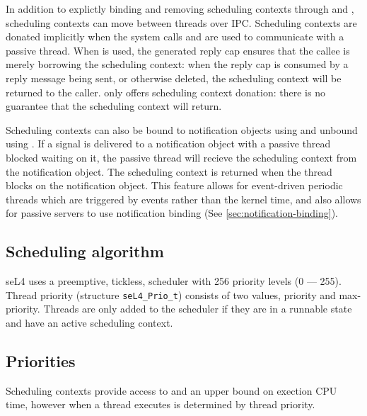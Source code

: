 In addition to explictly binding and removing scheduling contexts through  and , scheduling contexts can move between threads over IPC.
Scheduling contexts are donated implicitly when the system calls  and  are used to communicate with a passive thread.
When  is used, the generated reply cap ensures that the callee is merely borrowing the scheduling context: when the reply cap is consumed by a reply message being sent, or otherwise deleted, the scheduling context will be returned to the caller.
 only offers scheduling context donation: there is no guarantee that the scheduling context will return.

Scheduling contexts can also be bound to notification objects using  and unbound using .
If a signal is delivered to a notification object with a passive thread blocked waiting on it, the passive thread will recieve the scheduling context from the notification object.
The scheduling context is returned when the thread blocks on the notification object. 
This feature allows for event-driven periodic threads which are triggered by events rather than the kernel time, and also allows for passive servers to use notification binding (See \autoref{sec:notification-binding}).

\subsection{Scheduling algorithm}
\label{sec:sched}

seL4 uses a preemptive, tickless, scheduler with 256 priority levels (0 --- 255).
Thread priority (structure \texttt{seL4\_Prio\_t}) consists of two values, priority and max-priority.
Threads are only added to the scheduler if they are in a runnable state and have an active scheduling context.

\subsection{Priorities}

Scheduling contexts provide access to and an upper bound on exection CPU time, however when a thread executes is determined by thread priority.

